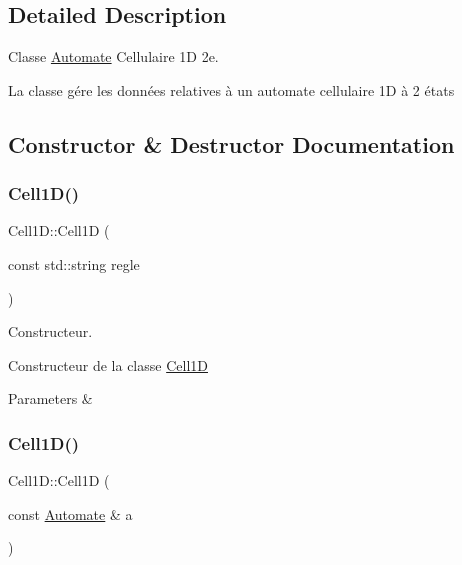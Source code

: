 \subsection{Detailed Description}
Classe \mbox{\hyperlink{class_automate}{Automate}} Cellulaire 1D 2e. 

La classe gére les données relatives à un automate cellulaire 1D à 2 états 

\subsection{Constructor \& Destructor Documentation}
\mbox{\label{class_cell1_d_a0add85ca9873fd68bdcee14e8052a308}} 
\subsubsection{\texorpdfstring{Cell1\+D()}{Cell1D()}\hspace{0.1cm}{\footnotesize\ttfamily [1/2]}}
{\footnotesize\ttfamily Cell1\+D\+::\+Cell1D (\begin{DoxyParamCaption}\item[{const std\+::string}]{regle }\end{DoxyParamCaption})}



Constructeur. 

Constructeur de la classe \mbox{\hyperlink{class_cell1_d}{Cell1D}}


\begin{DoxyParams}{Parameters}
{\em } & \\
\hline
\end{DoxyParams}
\mbox{\label{class_cell1_d_a19f146ea795bddf124f4028786b4dfca}} 
\subsubsection{\texorpdfstring{Cell1\+D()}{Cell1D()}\hspace{0.1cm}{\footnotesize\ttfamily [2/2]}}
{\footnotesize\ttfamily Cell1\+D\+::\+Cell1D (\begin{DoxyParamCaption}\item[{const \mbox{\hyperlink{class_automate}{Automate}} \&}]{a }\end{DoxyParamCaption})}



